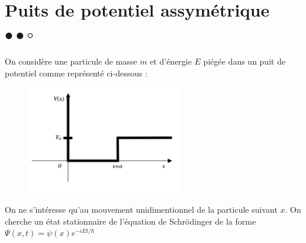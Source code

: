 \documentclass{report}
\begin{document}
\section*{Puits de potentiel assymétrique $\bullet\bullet\circ$}

On considère une particule de masse $m$ et d'énergie $E$ piégée dans un puit de potentiel comme représenté ci-dessous :

\begin{figure}[h!]
\centering
  \includegraphics[width=0.6\textwidth]{puits_assy.png}
\end{figure}

On ne s'intéresse qu'au mouvement unidimentionnel de la particule suivant $x$. On cherche un état stationnaire de l'équation de Schrödinger de la forme $\Psi(x,t)=\psi(x)e^{-iEt/\hbar}$
\end{document}
